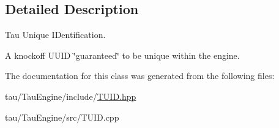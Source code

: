 \subsection{Detailed Description}
Tau Unique I\+Dentification.

A knockoff U\+U\+ID \char`\"{}guaranteed\char`\"{} to be unique within the engine. 

The documentation for this class was generated from the following files\+:\begin{DoxyCompactItemize}
\item 
tau/\+Tau\+Engine/include/\mbox{\hyperlink{_t_u_i_d_8hpp}{T\+U\+I\+D.\+hpp}}\item 
tau/\+Tau\+Engine/src/T\+U\+I\+D.\+cpp\end{DoxyCompactItemize}
